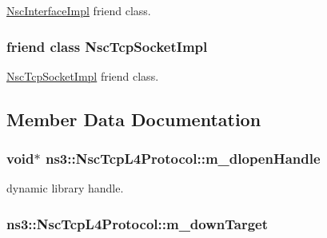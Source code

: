 \hyperlink{classns3_1_1NscInterfaceImpl}{Nsc\+Interface\+Impl} friend class. 

\subsubsection[{\texorpdfstring{Nsc\+Tcp\+Socket\+Impl}{NscTcpSocketImpl}}]{\setlength{\rightskip}{0pt plus 5cm}friend class {\bf Nsc\+Tcp\+Socket\+Impl}\hspace{0.3cm}{\ttfamily [friend]}}\hypertarget{classns3_1_1NscTcpL4Protocol_ae004dd5b6155dc0a19b62d246b3b015e}{}\label{classns3_1_1NscTcpL4Protocol_ae004dd5b6155dc0a19b62d246b3b015e}


\hyperlink{classns3_1_1NscTcpSocketImpl}{Nsc\+Tcp\+Socket\+Impl} friend class. 



\subsection{Member Data Documentation}
\subsubsection[{\texorpdfstring{m\+\_\+dlopen\+Handle}{m_dlopenHandle}}]{\setlength{\rightskip}{0pt plus 5cm}void$\ast$ ns3\+::\+Nsc\+Tcp\+L4\+Protocol\+::m\+\_\+dlopen\+Handle\hspace{0.3cm}{\ttfamily [private]}}\hypertarget{classns3_1_1NscTcpL4Protocol_ac71d70c67385bf9ac7f41fa5f5366bf7}{}\label{classns3_1_1NscTcpL4Protocol_ac71d70c67385bf9ac7f41fa5f5366bf7}


dynamic library handle. 

\subsubsection[{\texorpdfstring{m\+\_\+down\+Target}{m_downTarget}}]{ ns3\+::\+Nsc\+Tcp\+L4\+Protocol\+::m\+\_\+down\+Target\hspace{0.3cm}{\ttfamily [private]}}\hypertarget{classns3_1_1NscTcpL4Protocol_a83227e4d5dbb352bb29edf0ee48a026e}{}\label{classns3_1_1NscTcpL4Protocol_a83227e4d5dbb352bb29edf0ee48a026e}



